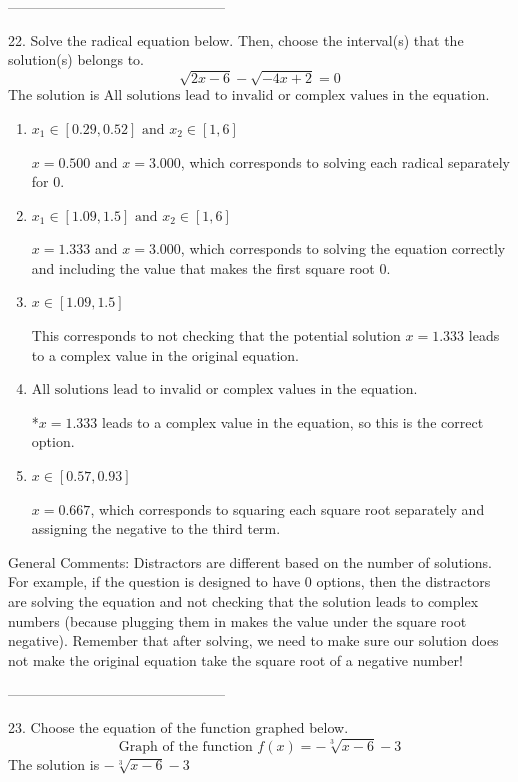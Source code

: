 \documentclass{extbook}[14pt]
\begin{document}
-----------------------------------------------

22. Solve the radical equation below. Then, choose the interval(s) that the solution(s) belongs to.
\[ \sqrt{2 x - 6} - \sqrt{-4 x + 2} = 0 \] 
The solution is $ \text{All solutions lead to invalid or complex values in the equation.} $ 

\begin{enumerate}[label=\Alph*.] 
\item $ x_1 \in [0.29, 0.52] \text{ and } x_2 \in [1,6] $ 

 $x = 0.500$ and $x = 3.000$, which corresponds to solving each radical separately for 0. 
\item $ x_1 \in [1.09, 1.5] \text{ and } x_2 \in [1,6] $ 

 $x = 1.333$ and $x = 3.000$, which corresponds to solving the equation correctly and including the value that makes the first square root 0. 
\item $ x \in [1.09,1.5] $ 

 This corresponds to not checking that the potential solution $x = 1.333$ leads to a complex value in the original equation. 
\item $ \text{All solutions lead to invalid or complex values in the equation.} $ 

 *$x = 1.333$ leads to a complex value in the equation, so this is the correct option. 
\item $ x \in [0.57,0.93] $ 

 $x = 0.667$, which corresponds to squaring each square root separately and assigning the negative to the third term. 
\end{enumerate} 
 
General Comments: Distractors are different based on the number of solutions. For example, if the question is designed to have 0 options, then the distractors are solving the equation and not checking that the solution leads to complex numbers (because plugging them in makes the value under the square root negative). Remember that after solving, we need to make sure our solution does not make the original equation take the square root of a negative number!

-----------------------------------------------

23. Choose the equation of the function graphed below.
\[ \text{Graph of the function } f(x) = - \sqrt[3]{x - 6} - 3 \] 
The solution is $ - \sqrt[3]{x - 6} - 3 $ 
\end{document}
